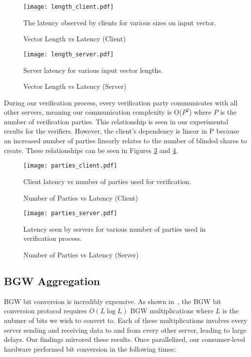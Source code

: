 \documentclass[conference]{IEEEtran}
\begin{document}
\begin{figure}
\texttt{[image: length\_client.pdf]}\\
\caption{Vector Length vs Latency (Client)}
\label{fig:length_client}
\medskip
\small
The latency observed by clients for various sizes on input vector.
\end{figure}
\begin{figure}
\texttt{[image: length\_server.pdf]}\\
\caption{Vector Length vs Latency (Server)}
\label{fig:length_server}
\medskip
\small
Server latency for various input vector lengths.
\end{figure}



During our verification process, every verification party communicates with all other servers, meaning our communication complexity is O($P^2$) where $P$ is the number of verification parties. This relationship is seen in our experimental results for the verifiers. However, the client's dependency is linear in P because an increased number of parties linearly relates to the number of blinded shares to create. These relationships can be seen in Figures \ref{fig:parties_client} and \ref{fig:parties_server}.\\

\begin{figure}
\texttt{[image: parties\_client.pdf]}\\
\caption{Number of Parties vs Latency (Client)}
\label{fig:parties_client}
\medskip
\small
Client latency vs number of parties used for verification.
\end{figure}
\begin{figure}
\texttt{[image: parties\_server.pdf]}\\
\caption{Number of Parties vs Latency (Server)}
\label{fig:parties_server}
\medskip
\small
Latency seen by servers for various number of parties used in verification process.
\end{figure}


\subsection{BGW Aggregation}
BGW bit conversion is incredibly expensive. As shown in~\cite{Damgard:2006:USC:2180286.2180307}, the BGW bit conversion protocol requires $O(L \log L)$ BGW multiplications where $L$ is the nubmer of bits we wish to convert to. Each of these multiplications involves every server sending and receiving data to and from every other server, leading to large delays. Our findings mirrored these results. Once parallelized, our consumer-level hardware performed bit conversion in the following times:\\
\end{document}
